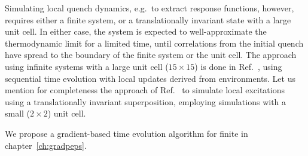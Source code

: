 Simulating local quench dynamics, e.g.~to extract response functions, however, requires either a finite system, or a translationally invariant state with a large unit cell.
%
In either case, the system is expected to well-approximate the thermodynamic limit for a limited time, until correlations from the initial quench have spread to the boundary of the finite system or the unit cell.
%
The approach using infinite systems with a large unit cell ($15 \times 15$) is done in Ref.~\cite{espinoza2024}, using sequential time evolution with local updates derived from  environments.
%
Let us mention for completeness the approach of Ref.~\cite{hubig2020a} to simulate local excitations using a translationally invariant superposition, employing  simulations with a small ($2\times 2$) unit cell.

We propose a gradient-based time evolution algorithm for finite  in chapter~\ref{ch:gradpeps}.
